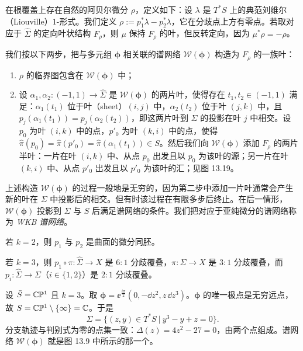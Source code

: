 在根覆盖上存在自然的阿贝尔微分 $\rho$，定义如下：设 $\lambda$ 是 $T^*S$ 上的典范刘维尔（Liouville）$1$-形式。我们定义 $\rho:=p_1^*\lambda-p_2^*\lambda$，它在分歧点上方有零点。若取对应于 $\hat\Sigma$ 的定向叶状结构 $F_\rho$，则 $\mu$ 保持 $F_\rho$ 的叶，但反转定向，因为 $\mu^*\rho=-\rho$。

我们按以下两步，把与多元组 $\boldsymbol\phi$ 相关联的谱网络 $\mathcal{W}(\boldsymbol\phi)$ 构造为 $F_\rho$ 的一族叶：
\begin{enumerate}
\item $\rho$ 的临界图包含在 $\mathcal{W}(\boldsymbol\phi)$ 中；
\item 设 $\alpha_1,\alpha_2\colon(-1,1)\to\hat\Sigma$ 是 $\mathcal{W}(\boldsymbol\phi)$ 的两片叶，使得存在 $t_1,t_2\in(-1,1)$ 满足：$\alpha_1(t_1)$ 位于叶（sheet）$(i,j)$ 中，$\alpha_2(t_2)$ 位于叶 $(j,k)$ 中，且 $p_j(\alpha_1(t_1))=p_j(\alpha_2(t_2))$，即这两片叶到 $\Sigma$ 的投影在叶 $j$ 中相交。设 $p_0$ 为叶 $(i,k)$ 中的点，$p'_0$ 为叶 $(k,i)$ 中的点，使得 $\hat\pi(p_0)=\hat\pi(p'_0)=\hat\pi(\alpha_1(t_1))\in S$。然后我们向 $\mathcal{W}(\boldsymbol\phi)$ 添加 $F_\rho$ 的两片半叶：一片在叶 $(i,k)$ 中、从点 $p_0$ 出发且以 $p_0$ 为该叶的源；另一片在叶 $(k,i)$ 中、从点 $p'_0$ 出发且以 $p'_0$ 为该叶的汇；见图 13.19。
\end{enumerate}


上述构造 $\mathcal{W}(\boldsymbol\phi)$ 的过程一般地是无穷的，因为第二步中添加一片叶通常会产生新的叶在 $\Sigma$ 中投影后的相交。但有时该过程在有限多步后终止。在后一情形，$\mathcal{W}(\boldsymbol\phi)$ 投影到 $\Sigma$ 与 $S$ 后满足谱网络的条件。我们把对应于亚纯微分的谱网络称为 \emph{WKB 谱网络}。

\begin{example}[13.24]
若 $k=2$，则 $p_1$ 与 $p_2$ 是曲面的微分同胚。

若 $k=3$，则 $p_1\circ\pi\colon\hat\Sigma\to X$ 是 $6:1$ 分歧覆叠，$\pi\colon\Sigma\to X$ 是 $3:1$ 分歧覆叠，而 $p_i\colon\hat\Sigma\to\Sigma$（$i\in\{1,2\}$）是 $2:1$ 分歧覆叠。
\end{example}


\begin{example}[13.25]
设 $\bar S=\mathbb{C}\mathbb{P}^1$ 且 $k=3$。取 $\boldsymbol\phi=\ee^{\frac{i\pi}{2}}(0,-\dd z^2,z\,\dd z^3)$。$\boldsymbol\phi$ 的唯一极点是无穷远点，故 $S=\mathbb{C}\mathbb{P}^1\setminus\{\infty\}=\mathbb{C}$。于是
\[
\Sigma=\bigl\{(z,y)\in T^*S\ \big|\ y^3-y+z=0\bigr\}.
\]
分支轨迹与判别式为零的点集一致：$\Delta(z)=4z^2-27=0$，由两个点组成。谱网络 $\mathcal{W}(\boldsymbol\phi)$ 就是图 13.9 中所示的那一个。
\end{example}

